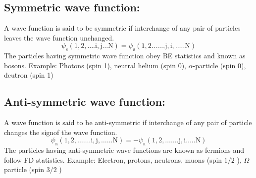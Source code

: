\subsection{ Symmetric wave function:}
A wave function is said to be symmetric if interchange of any pair of particles leaves the wave function unchanged.
$$
\psi_{\mathrm{s}}(1,2, \ldots . \mathrm{i}, \mathrm{j} \ldots \mathrm{N})=\psi_{\mathrm{s}}(1,2 \ldots \ldots . \mathrm{j}, \mathrm{i}, \ldots . . \mathrm{N})
$$
The particles having symmetric wave function obey BE statistics and known as bosons.
Example: Photons (spin 1), neutral helium (spin 0), $\alpha$-particle (spin 0), deutron (spin 1)\\
\subsection{ Anti-symmetric wave function:}
A wave function is said to be anti-symmetric if interchange of any pair of particle changes the signof the wave function.
$$
\psi_{\mathrm{a}}(1,2, \ldots \ldots . \mathrm{i}, \mathrm{j}, \ldots \ldots \mathrm{N})=-\psi_{\mathrm{a}}(1,2, \ldots \ldots . \mathrm{j}, \mathrm{i} \ldots . . \mathrm{N})
$$
The particles having anti-symmetric wave functions are known as fermions and follow FD statistics. Example: Electron, protons, neutrons, muons (spin $1 / 2$ ), $\Omega$ particle (spin $3 / 2$ )
